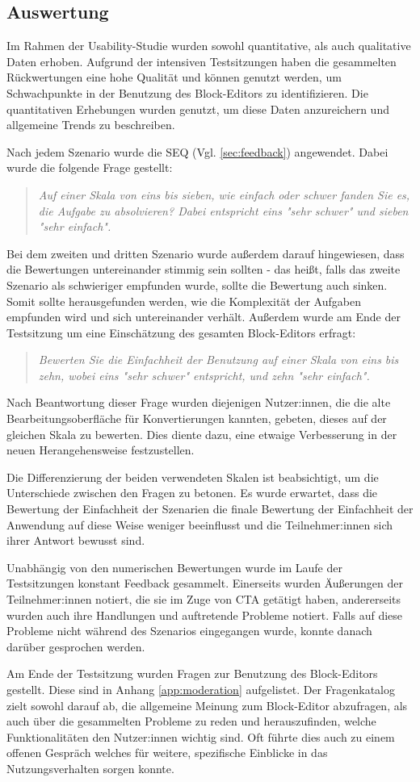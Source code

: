 \subsection{Auswertung}
Im Rahmen der Usability-Studie wurden sowohl quantitative, als auch qualitative Daten erhoben. Aufgrund der intensiven Testsitzungen haben die gesammelten Rückwertungen eine hohe Qualität und können genutzt werden, um Schwachpunkte in der Benutzung des Block-Editors zu identifizieren. Die quantitativen Erhebungen wurden genutzt, um diese Daten anzureichern und allgemeine Trends zu beschreiben.

\pskip
Nach jedem Szenario wurde die \ac{SEQ} (Vgl. \ref{sec:feedback}) angewendet. Dabei wurde die folgende Frage gestellt:
\begin{quote}
  \textit{
    Auf einer Skala von eins bis sieben, wie einfach oder schwer fanden Sie es, die Aufgabe zu absolvieren? Dabei entspricht eins "sehr schwer" und sieben "sehr einfach".}
\end{quote}
Bei dem zweiten und dritten Szenario wurde außerdem darauf hingewiesen, dass die Bewertungen untereinander stimmig sein sollten - das heißt, falls das zweite Szenario als schwieriger empfunden wurde, sollte die Bewertung auch sinken. Somit sollte herausgefunden werden, wie die Komplexität der Aufgaben empfunden wird und sich untereinander verhält. Außerdem wurde am Ende der Testsitzung um eine Einschätzung des gesamten Block-Editors erfragt:
\begin{quote}
  \textit{
    Bewerten Sie die Einfachheit der Benutzung auf einer Skala von eins bis zehn, wobei eins "sehr schwer" entspricht, und zehn "sehr einfach".
  }
\end{quote}
Nach Beantwortung dieser Frage wurden diejenigen Nutzer:innen, die die alte Bearbeitungsoberfläche für Konvertierungen kannten, gebeten, dieses auf der gleichen Skala zu bewerten. Dies diente dazu, eine etwaige Verbesserung in der neuen Herangehensweise festzustellen.

Die Differenzierung der beiden verwendeten Skalen ist beabsichtigt, um die Unterschiede zwischen den Fragen zu betonen. Es wurde erwartet, dass die Bewertung der Einfachheit der Szenarien die finale Bewertung der Einfachheit der Anwendung auf diese Weise weniger beeinflusst und die Teilnehmer:innen sich ihrer Antwort bewusst sind.

\pskip
Unabhängig von den numerischen Bewertungen wurde im Laufe der Testsitzungen konstant Feedback gesammelt. Einerseits wurden Äußerungen der Teilnehmer:innen notiert, die sie im Zuge von \ac{CTA} getätigt haben, andererseits wurden auch ihre Handlungen und auftretende Probleme notiert. Falls auf diese Probleme nicht während des Szenarios eingegangen wurde, konnte danach darüber gesprochen werden.

Am Ende der Testsitzung wurden Fragen zur Benutzung des Block-Editors gestellt. Diese sind in Anhang \ref{app:moderation} aufgelistet. Der Fragenkatalog zielt sowohl darauf ab, die allgemeine Meinung zum Block-Editor abzufragen, als auch über die gesammelten Probleme zu reden und herauszufinden, welche Funktionalitäten den Nutzer:innen wichtig sind. Oft führte dies auch zu einem offenen Gespräch welches für weitere, spezifische Einblicke in das Nutzungsverhalten sorgen konnte.
